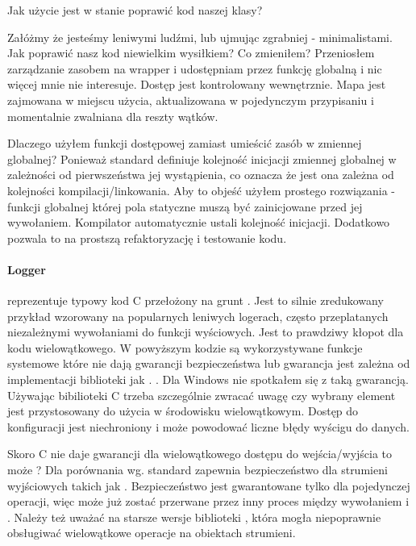 Jak użycie  jest w stanie poprawić kod naszej klasy? 

Załóżmy że jesteśmy leniwymi ludźmi, lub ujmując zgrabniej - minimalistami. Jak poprawić nasz kod niewielkim wysiłkiem?
Co zmieniłem?
Przeniosłem zarządzanie zasobem na wrapper  i udostępniam przez funkcję globalną i nic więcej mnie nie interesuje. Dostęp jest kontrolowany wewnętrznie. Mapa jest zajmowana w miejscu użycia, aktualizowana w pojedynczym przypisaniu i momentalnie zwalniana dla reszty wątków.

Dlaczego użyłem funkcji dostępowej zamiast umieścić zasób w zmiennej globalnej?
Ponieważ standard definiuje kolejność inicjacji zmiennej globalnej w zależności od pierwszeństwa jej wystąpienia, co oznacza że jest ona zależna od kolejności kompilacji/linkowania. Aby to objeść użyłem prostego rozwiązania - funkcji globalnej której pola statyczne muszą być zainicjowane przed jej wywołaniem. Kompilator automatycznie ustali kolejność inicjacji. Dodatkowo pozwala to na prostszą refaktoryzację i testowanie kodu.

\paragraph{Logger}
 reprezentuje typowy kod C przełożony na grunt \Cpp{}. Jest to silnie zredukowany przykład wzorowany na popularnych leniwych logerach, często przeplatanych niezależnymi wywołaniami do funkcji wyściowych. Jest to prawdziwy kłopot dla kodu wielowątkowego.
W powyższym kodzie są wykorzystywane funkcje systemowe które nie dają gwarancji bezpieczeństwa lub gwarancja jest zależna od implementacji biblioteki jak . . Dla Windows nie spotkałem się z taką gwarancją. Używając bibilioteki C trzeba szczególnie zwracać uwagę czy wybrany element jest przystosowany do użycia w środowisku wielowątkowym. Dostęp do konfiguracji jest niechroniony i może powodować liczne błędy wyścigu do danych.

Skoro C nie daje gwarancji dla wielowątkowego dostępu do wejścia/wyjścia to może \Cpp{}?
Dla porównania wg.  standard zapewnia bezpieczeństwo dla strumieni wyjściowych takich jak . Bezpieczeństwo jest gwarantowane tylko dla pojedynczej operacji, więc  może już zostać przerwane przez inny proces między wywołaniem  i . Należy też uważać na starsze wersje biblioteki , która mogła niepoprawnie obsługiwać wielowątkowe operacje na obiektach strumieni.

